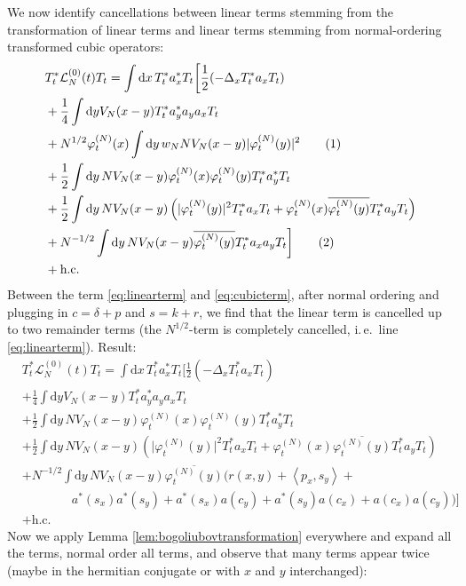 \documentclass[11pt,a4paper]{scrartcl} %
\newcommand{\di}{\textrm{d}}		%
\newcommand{\Lcal}{\mathcal{L}}		%
\newcommand{\hc}{\mbox{h.c.}}		%
\newcommand{\scal}[2]{\left<#1,#2\right>} %
\newcommand{\cc}[1]{\overline{#1}}	%
\newcommand{\ph}{\varphi_t^{(N)}}	%
\newcommand{\tagg}[1]{ \stepcounter{equation} \tag{\theequation} \label{eq:#1} } %
\newcommand{\eqr}[1]{\eqref{eq:#1}}			%
\begin{document}
We now identify cancellations between linear terms stemming from the transformation of linear terms and linear terms stemming from normal-ordering transformed cubic operators:
\begin{align*}
& T^*_t \Lcal^{(0)}_N(t) T_t = \int \di x\, T^*_t a^*_x T_t \bigg[   \frac{1}{2}(-\Delta_x T^*_t a_x T_t) \\
& + \frac{1}{4}\int \di y V_N(x-y) T^*_t a^*_y a_y a_x T_t \\
& + N^{1/2} \ph(x) \int \di y\, w_N N V_N(x-y) \lvert \ph(y) \rvert^2 \tagg{linearterm} \\
& + \frac{1}{2} \int \di y\, NV_N(x-y)  \ph(x) \ph(y)  T^*_t a^*_y T_t \\
& + \frac{1}{2} \int \di y\, NV_N(x-y) \left(  \lvert \ph(y)\rvert^2 T^*_t a_x T_t + \ph(x) \cc{\ph(y)} T^*_t a_y T_t  \right) \\
& + N^{-1/2} \int \di y\, NV_N(x-y) \cc{\ph(y)} T^*_t a_x a_y T_t  \bigg]\tagg{cubicterm} \\
& + \hc
\end{align*}
Between the term \eqr{linearterm} and \eqr{cubicterm}, after normal ordering and plugging in $c = \delta + p$ and $s = k + r$, we find that the linear term is cancelled up to two remainder terms (the $N^{1/2}$-term is completely cancelled, i.\,e.\ line \eqr{linearterm}). Result:
\begin{align*}
& T^*_t \Lcal^{(0)}_N(t) T_t = \int \di x\, T^*_t a^*_x T_t \bigg[   \frac{1}{2}(-\Delta_x T^*_t a_x T_t) \\
& + \frac{1}{4}\int \di y V_N(x-y) T^*_t a^*_y a_y a_x T_t \\
& + \frac{1}{2} \int \di y\, NV_N(x-y)  \ph(x) \ph(y)  T^*_t a^*_y T_t \\
& + \frac{1}{2} \int \di y\, NV_N(x-y) \left(  \lvert \ph(y)\rvert^2 T^*_t a_x T_t + \ph(x) \cc{\ph(y)} T^*_t a_y T_t  \right) \\
& + N^{-1/2} \int \di y\, NV_N(x-y) \cc{\ph(y)} \bigg( r(x,y) + \scal{p_x}{s_y} + \\
& \qquad \qquad  a^*(s_x) a^*(s_y) + a^*(s_x) a(c_y)  + a^*(s_y) a(c_x) + a(c_x) a(c_y)  \bigg)  \bigg] \\
& + \hc
\end{align*}
Now we apply Lemma \ref{lem:bogoliubovtransformation} everywhere and expand all the terms, normal order all terms, and observe that many terms appear twice (maybe in the hermitian conjugate or with $x$ and $y$ interchanged):
\end{document}
